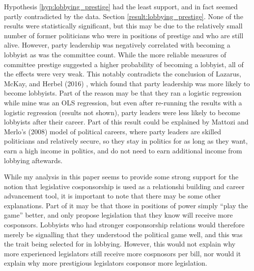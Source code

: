 \documentclass{article}
\begin{document}
  Hypothesis \ref{hyp:lobbying_prestige} had the least support, and in fact seemed partly contradicted by the data. Section \ref{result:lobbying_prestige}. None of the results were statistically significant, but this may be due to the relatively small number of former politicians who were in positions of prestige and who are still alive. However, party leadership was negatively correlated with becoming a lobbyist as was the committee count. While the more reliable measures of committee prestige suggested a higher probability of becoming a lobbyist, all of the effects were very weak. This notably contradicts the conclusion of Lazarus, McKay, and Herbel (2016) \cite{lazarus_mckay_herbel2016}, which found that party leadership was more likely to become lobbyists. Part of the reason may be that they ran a logistic regression while mine was an OLS regression, but even after re-running the results with a logistic regression (results not shown), party leaders were less likely to become lobbyists after their career. Part of this result could be explained by Mattozi and Merlo's (2008) \cite{mattozzi_merlo2008} model of political careers, where party leaders are skilled politicians and relatively secure, so they stay in politics for as long as they want, earn a high income in politics, and do not need to earn additional income from lobbying aftewards. 

  While my analysis in this paper seems to provide some strong support for the notion that legislative cosponsorship is used as a relationshi building and career advancement tool, it is important to note that there may be some other explanations. Part of it may be that those in positions of power simply ``play the game'' better, and only propose legislation that they know will receive more cosponsors. Lobbyists who had stronger cosponsorship relations would therefore merely be signalling that they understood the political game well, and this was the trait being selected for in lobbying. However, this would not explain why more experienced legislators still receive more cospnosors per bill, nor would it explain why more prestigious legislators cosponsor more legislation. 
\end{document}
